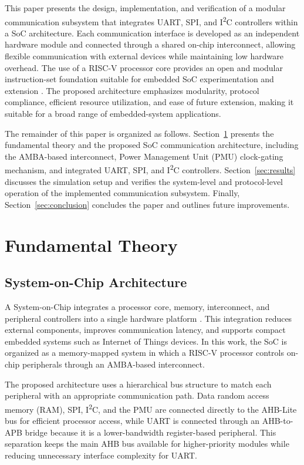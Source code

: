 \documentclass[runningheads]{llncs}
\begin{document}
This paper presents the design, implementation, and verification of a modular communication subsystem that integrates UART, SPI, and I\textsuperscript{2}C controllers within a SoC architecture. Each communication interface is developed as an independent hardware module and connected through a shared on-chip interconnect, allowing flexible communication with external devices while maintaining low hardware overhead. The use of a RISC-V processor core provides an open and modular instruction-set foundation suitable for embedded SoC experimentation and extension \cite{patterson2021,riscv2019}. The proposed architecture emphasizes modularity, protocol compliance, efficient resource utilization, and ease of future extension, making it suitable for a broad range of embedded-system applications.

The remainder of this paper is organized as follows. Section~\ref{sec:theory} presents the fundamental theory and the proposed SoC communication architecture, including the AMBA-based interconnect, Power Management Unit (PMU) clock-gating mechanism, and integrated UART, SPI, and I\textsuperscript{2}C controllers. Section~\ref{sec:results} discusses the simulation setup and verifies the system-level and protocol-level operation of the implemented communication subsystem. Finally, Section~\ref{sec:conclusion} concludes the paper and outlines future improvements.

\section{Fundamental Theory}
\label{sec:theory}

\subsection{System-on-Chip Architecture}

A System-on-Chip integrates a processor core, memory, interconnect, and peripheral controllers into a single hardware platform \cite{wolf2012,furber2000,rabaey2003}. This integration reduces external components, improves communication latency, and supports compact embedded systems such as Internet of Things devices. In this work, the SoC is organized as a memory-mapped system in which a RISC-V processor controls on-chip peripherals through an AMBA-based interconnect.

The proposed architecture uses a hierarchical bus structure to match each peripheral with an appropriate communication path. Data random access memory (RAM), SPI, I\textsuperscript{2}C, and the PMU are connected directly to the AHB-Lite bus for efficient processor access, while UART is connected through an AHB-to-APB bridge because it is a lower-bandwidth register-based peripheral. This separation keeps the main AHB bus available for higher-priority modules while reducing unnecessary interface complexity for UART.
\end{document}
